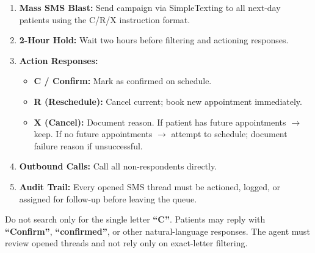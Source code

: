 \documentclass[11pt,a4paper]{article}
\begin{document}
\begin{tcolorbox}[infobox,title={Confirmation Cycle --- Step by Step}]
\begin{enumerate}
  \item \textbf{Mass SMS Blast:} Send campaign via SimpleTexting to all next-day patients using the C/R/X instruction format.
  \item \textbf{2-Hour Hold:} Wait two hours before filtering and actioning responses.
  \item \textbf{Action Responses:}
    \begin{itemize}
      \item \textcolor{SuccessGreen}{\bfseries C / Confirm:} Mark as confirmed on schedule.
      \item \textcolor{WarningAmber}{\bfseries R (Reschedule):} Cancel current; book new appointment immediately.
      \item \textcolor{DangerRed}{\bfseries X (Cancel):} Document reason. If patient has future appointments $\rightarrow$ keep. If no future appointments $\rightarrow$ attempt to schedule; document failure reason if unsuccessful.
    \end{itemize}
  \item \textbf{Outbound Calls:} Call all non-respondents directly.
  \item \textbf{Audit Trail:} Every opened SMS thread must be actioned, logged, or assigned for follow-up before leaving the queue.
\end{enumerate}
\end{tcolorbox}

\begin{tcolorbox}[warnbox,title={SimpleTexting Search Rule}]
Do not search only for the single letter \textbf{``C''}. Patients may reply with \textbf{``Confirm''},
\textbf{``confirmed''}, or other natural-language responses. The agent must review opened threads and not rely only on exact-letter filtering.
\end{tcolorbox}
\end{document}
